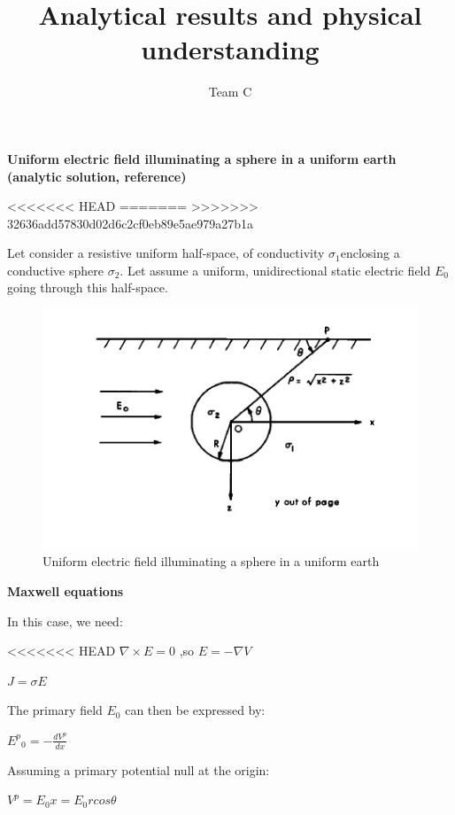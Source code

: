 \documentclass[11pt,letterpaper,leqno]{amsart}
\title{Analytical results and physical understanding}
\author{Team C}
\numberwithin{equation}{section}
\begin{document}
\maketitle
\thispagestyle{empty}



\Large
\textbf{Uniform electric field illuminating a sphere in a uniform earth (analytic solution, reference)}

<<<<<<< HEAD
\normalsize
=======
>>>>>>> 32636add57830d02d6c2cf0eb89e5ae979a27b1a
\vspace{0.4cm}

Let consider a  resistive uniform half-space, of conductivity $\sigma_1$enclosing a conductive sphere $\sigma_2$. Let assume a uniform, unidirectional static electric field $E_0$ going through this half-space.

\begin{figure}[h]
\caption{Uniform electric field illuminating a sphere in a uniform earth}
\includegraphics[scale=0.7]{electrostaticsphere.png}
\end{figure}

\vspace{0.4cm}
\textbf{Maxwell equations}
\vspace{0.4cm}


In this case, we need:

<<<<<<< HEAD
$\nabla \times E =0$ \quad,so \quad $E=-\nabla V$

$J=\sigma E$

The primary field $E_0$ can then be expressed by:

${E^p}_0=-\frac{dV^p}{dx}$

Assuming a primary potential null at the origin:

$V^p=E_0x=E_0 r cos\theta$
\end{document}
